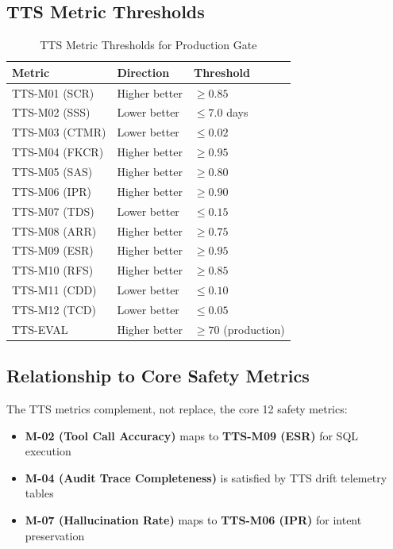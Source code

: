 \subsection{TTS Metric Thresholds}

\begin{table}[htbp]
\centering
\caption{TTS Metric Thresholds for Production Gate}
\label{tab:tts-thresholds}
\begin{tabular}{l l l}
\toprule
\textbf{Metric} & \textbf{Direction} & \textbf{Threshold} \\
\midrule
TTS-M01 (SCR) & Higher better & $\geq 0.85$ \\
TTS-M02 (SSS) & Lower better & $\leq 7.0$ days \\
TTS-M03 (CTMR) & Lower better & $\leq 0.02$ \\
TTS-M04 (FKCR) & Higher better & $\geq 0.95$ \\
TTS-M05 (SAS) & Higher better & $\geq 0.80$ \\
TTS-M06 (IPR) & Higher better & $\geq 0.90$ \\
TTS-M07 (TDS) & Lower better & $\leq 0.15$ \\
TTS-M08 (ARR) & Higher better & $\geq 0.75$ \\
TTS-M09 (ESR) & Higher better & $\geq 0.95$ \\
TTS-M10 (RFS) & Higher better & $\geq 0.85$ \\
TTS-M11 (CDD) & Lower better & $\leq 0.10$ \\
TTS-M12 (TCD) & Lower better & $\leq 0.05$ \\
\midrule
TTS-EVAL & Higher better & $\geq 70$ (production) \\
\bottomrule
\end{tabular}
\end{table}

\subsection{Relationship to Core Safety Metrics}

The TTS metrics complement, not replace, the core 12 safety metrics:

\begin{itemize}
  \item \textbf{M-02 (Tool Call Accuracy)} maps to \textbf{TTS-M09 (ESR)} for SQL execution
  \item \textbf{M-04 (Audit Trace Completeness)} is satisfied by TTS drift telemetry tables
  \item \textbf{M-07 (Hallucination Rate)} maps to \textbf{TTS-M06 (IPR)} for intent preservation
\end{itemize}

